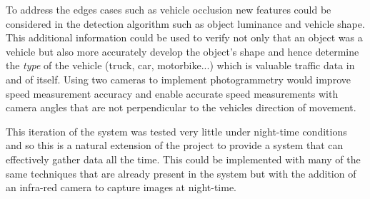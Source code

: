 To address the edges cases such as vehicle occlusion new features could be considered in the detection algorithm such as object luminance and vehicle shape. This additional information could be used to verify not only that an object was a vehicle but also more accurately develop the object's shape and hence determine the \emph{type} of the vehicle (truck, car, motorbike...) which is valuable traffic data in and of itself. Using two cameras to implement photogrammetry would improve speed measurement accuracy and enable accurate speed measurements with camera angles that are not perpendicular to the vehicles direction of movement.

This iteration of the system was tested very little under night-time conditions and so this is a natural extension of the project to provide a system that can effectively gather data all the time. This could be implemented with many of the same techniques that are already present in the system but with the addition of an infra-red camera to capture images at night-time. 